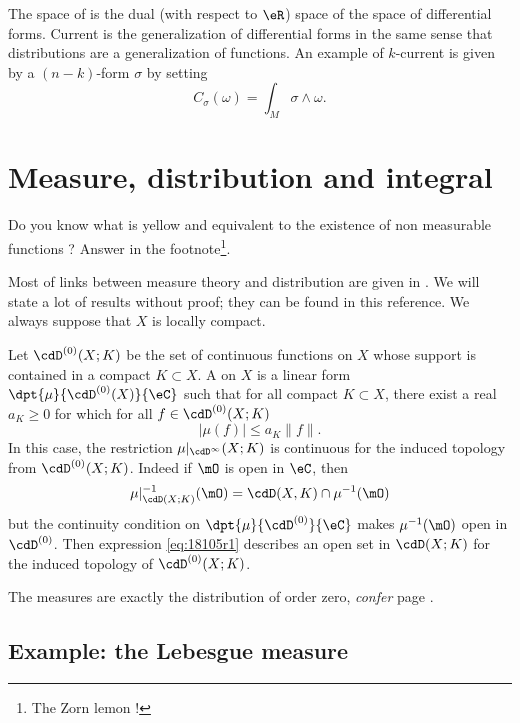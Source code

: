 The space of  is the dual (with respect to $\eR$) space of the space of differential forms. Current is the generalization of differential forms in the same sense that distributions are a generalization of functions. An example of $k$-current is given by a $(n-k)$-form $\sigma$ by setting
\[ 
  C_{\sigma}(\omega)=\int_M \sigma\wedge\omega.
\]


\section{Measure, distribution and integral} \label{sec_distrib_mesure}

Do you know what is yellow and equivalent to the existence of non measurable functions ? Answer in the footnote\footnote{The Zorn lemon !}.


Most of links between measure theory and distribution are given in \cite{Dieu2}. We will state a lot of results without proof; they can be found in this reference. We always suppose that $X$ is locally compact. 

Let $\cdD^{(0)}(X;K)$ be the set of continuous functions on $X$ whose support is contained in a compact $K\subset X$. A  on $X$ is a linear form $\dpt{\mu}{\cdD^{(0)}(X)}{\eC}$ such that for all compact $K\subset X$, there exist a real $a_K\geq 0$ for which for all $f\in\cdD^{(0)}(X;K)$
\begin{equation}
  | \mu(f) |\leq a_K\| f \|.
\end{equation}
In this case, the restriction $\mu|_{\cdD^{\infty}}(X;K)$ is continuous for the induced topology from $\cdD^{(0)}(X;K)$. Indeed if $\mO$ is open in $\eC$, then
\begin{equation}  \label{eq:18105r1}
  \mu|_{\cdD(X;K)}^{-1}(\mO)=\cdD(X,K)\cap\mu^{-1}(\mO)
\end{equation}
but the continuity condition on $\dpt{\mu}{\cdD^{(0)}}{\eC}$ makes $\mu^{-1}(\mO)$ open in $\cdD^{(0)}$. Then expression \eqref{eq:18105r1} describes an open set in $\cdD(X;K)$ for the induced topology of $\cdD^{(0)}(X;K)$. 

The measures are exactly the distribution of order zero, \emph{confer} page \pageref{pg:reforder}.

\subsection*{Example: the Lebesgue measure}

